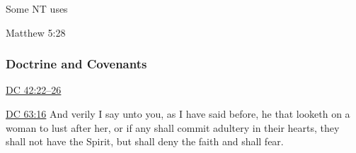				\begin{compactdesc}
					\item[Some NT uses] \textbf{}
						\begin{compactdesc}
							\item[Matthew 5:28] 
						\end{compactdesc}
				\end{compactdesc}
		
	
		
		
	\subsubsection{Doctrine and Covenants} %
		\label{ADULTERY-DC}
	
		
		\begin{compactdesc}
			\item[{\hyperref[DC42-22]{DC 42:22--26}}]
			\item[{\hyperref[DC63-16]{DC 63:16}}] And verily I say unto you, as I have said before, he that looketh on a woman to lust after her, or if any shall commit adultery in their hearts, they shall not have the Spirit, but shall deny the faith and shall fear.
		\end{compactdesc}
		
	
